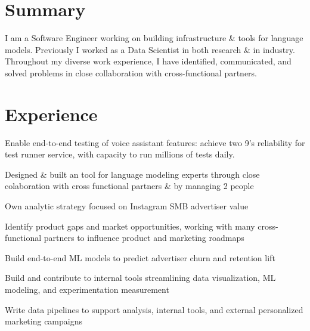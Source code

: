 \documentclass[]{deedy-resume-openfont}
\begin{document}
\hfill
\begin{minipage}[t]{0.63\textwidth}

\section{Summary}
I am a Software Engineer working on building infrastructure \& tools for language models.
Previously I worked as a Data Scientist in both research \& in industry.
Throughout my diverse work experience, I have identified,
communicated, and solved problems in close collaboration with
cross-functional partners.
\sectionsep




\section{Experience}
\vspace{\topsep}
\begin{tightemize}
\item {Enable end-to-end testing of voice assistant features: achieve two 9's reliability for test runner service, with capacity to run millions of tests daily.}
\item {Designed \& built an tool for language modeling experts through close colaboration with cross functional partners \& by managing 2 people}
\end{tightemize}
\sectionsep

\vspace{\topsep}
\begin{tightemize}
\item {Own analytic strategy focused on Instagram SMB advertiser value}
\item {Identify product gaps and market opportunities, working with many cross-functional
	partners to influence product and marketing roadmaps}
\item {Build end-to-end ML models to predict advertiser churn and retention lift}
\item {Build and contribute to internal tools streamlining data visualization, ML modeling, and experimentation measurement}
\item {Write data pipelines to support analysis, internal tools, and external personalized marketing campaigns}
\end{tightemize}
\sectionsep


\end{minipage}
\end{document}
